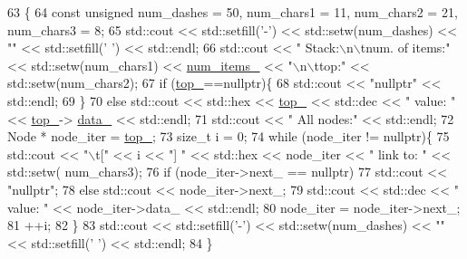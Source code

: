 \begin{DoxyCode}
63                              \{
64         \textcolor{keyword}{const} \textcolor{keywordtype}{unsigned} num\_dashes = 50, num\_chars1 = 11, num\_chars2 = 21, num\_chars3 = 8;
65         std::cout << std::setfill(\textcolor{charliteral}{'-'}) << std::setw(num\_dashes) << \textcolor{stringliteral}{""} << std::setfill(\textcolor{charliteral}{' '}) << std::endl;
66         std::cout << \textcolor{stringliteral}{"   Stack:\(\backslash\)n\(\backslash\)tnum. of items:"} << std::setw(num\_chars1) << 
      \hyperlink{classstacks_1_1_stack_a43923df95ebc551432e9d3e955c32959}{num\_items\_} << \textcolor{stringliteral}{"\(\backslash\)n\(\backslash\)ttop:"} << std::setw(num\_chars2);
67         \textcolor{keywordflow}{if} (\hyperlink{classstacks_1_1_stack_a68cd067db6b89353ec1f803eecd4cb74}{top\_}==\textcolor{keyword}{nullptr})\{
68             std::cout << \textcolor{stringliteral}{"nullptr"} << std::endl;
69         \}
70         \textcolor{keywordflow}{else} std::cout << std::hex << \hyperlink{classstacks_1_1_stack_a68cd067db6b89353ec1f803eecd4cb74}{top\_} << std::dec << \textcolor{stringliteral}{" value: "} << \hyperlink{classstacks_1_1_stack_a68cd067db6b89353ec1f803eecd4cb74}{top\_}->
      \hyperlink{structstacks_1_1_stack_1_1_node_afbadaa4f786b45d6cd157070caf8ab83}{data\_} << std::endl;
71         std::cout << \textcolor{stringliteral}{"    All nodes:"} << std::endl;
72         Node * node\_iter = \hyperlink{classstacks_1_1_stack_a68cd067db6b89353ec1f803eecd4cb74}{top\_};
73         \textcolor{keywordtype}{size\_t} i = 0;
74         \textcolor{keywordflow}{while} (node\_iter != \textcolor{keyword}{nullptr})\{
75             std::cout << \textcolor{stringliteral}{"\(\backslash\)t["} << i << \textcolor{stringliteral}{"] "} << std::hex << node\_iter << \textcolor{stringliteral}{" link to: "} << std::setw(
      num\_chars3);
76             \textcolor{keywordflow}{if} (node\_iter->next\_ == \textcolor{keyword}{nullptr})
77                 std::cout << \textcolor{stringliteral}{"nullptr"};
78             \textcolor{keywordflow}{else} std::cout << node\_iter->next\_;
79             std::cout << std::dec << \textcolor{stringliteral}{" value: "} << node\_iter->data\_ << std::endl;
80             node\_iter = node\_iter->next\_;
81             ++i;
82         \}
83         std::cout << std::setfill(\textcolor{charliteral}{'-'}) << std::setw(num\_dashes) << \textcolor{stringliteral}{""} << std::setfill(\textcolor{charliteral}{' '}) << std::endl;
84     \}
\end{DoxyCode}
\hypertarget{classstacks_1_1_stack_a2bd88c7b8faf901f4830ed616bf6478f}{}
